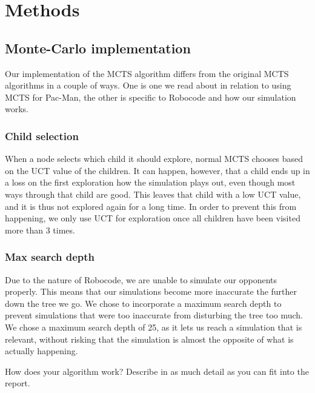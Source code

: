 \section{Methods}
\label{04}

\subsection{Monte-Carlo implementation}
\label{04_MCTS}

Our implementation of the MCTS algorithm differs from the original MCTS algorithms in a couple of ways. One is one we read about in relation to using MCTS for Pac-Man\cite{pepels2012enhancements}, the other is specific to Robocode and how our simulation works.

\subsubsection{Child selection}

When a node selects which child it should explore, normal MCTS chooses based on the UCT\cite{kocsis2006bandit} value of the children. It can happen, however, that a child ends up in a loss on the first exploration how the simulation plays out, even though most ways through that child are good. This leaves that child with a low UCT value, and it is thus not explored again for a long time. In order to prevent this from happening, we only use UCT for exploration once all children have been visited more than 3 times.

\subsubsection{Max search depth}

Due to the nature of Robocode, we are unable to simulate our opponents properly. This means that our simulations become more inaccurate the further down the tree we go. We chose to incorporate a maximum search depth to prevent simulations that were too inaccurate from disturbing the tree too much. We chose a maximum search depth of 25, as it lets us reach a simulation that is relevant, without risking that the simulation is almost the opposite of what is actually happening.





How does your algorithm work? Describe in as much detail as you can fit into the report. 

